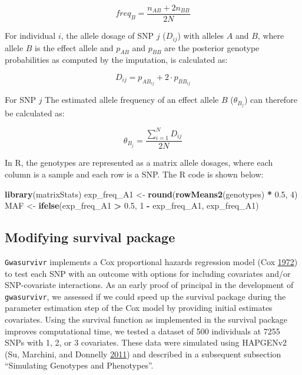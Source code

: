 \documentclass[]{DissertateOSU}
\newenvironment{Shaded}{\begin{snugshade}}{\end{snugshade}}
\newcommand{\KeywordTok}[1]{\textcolor[rgb]{0.13,0.29,0.53}{\textbf{#1}}}
\newcommand{\DecValTok}[1]{\textcolor[rgb]{0.00,0.00,0.81}{#1}}
\newcommand{\FloatTok}[1]{\textcolor[rgb]{0.00,0.00,0.81}{#1}}
\newcommand{\StringTok}[1]{\textcolor[rgb]{0.31,0.60,0.02}{#1}}
\newcommand{\OperatorTok}[1]{\textcolor[rgb]{0.81,0.36,0.00}{\textbf{#1}}}
\newcommand{\NormalTok}[1]{#1}
\begin{document}
\begin{equation} \label{1}
freq_B =  \frac{ n_{AB} + 2n_{BB}}{2N}
\end{equation}

\noindent For individual \(i\), the allele dosage of SNP \(j\)
(\(D_{ij}\)) with alleles \(A\) and \(B\), where allele \(B\) is the
effect allele and \(p_{AB}\) and \(p_{BB}\) are the posterior genotype
probabilities as computed by the imputation, is calculated as:

\begin{equation} \label{2}
D_{ij} = p_{AB_{ij}} + 2 \cdot p_{BB_{ij}}
\end{equation}

\noindent For SNP \(j\) The estimated allele frequency of an effect
allele \(B\) (\(\theta_{B_j}\)) can therefore be calculated as:

\begin{equation} \label{3}
\theta_{B_j} = \frac{\sum_{i=1}^{N} D_{ij} }{2N}
\end{equation}

\noindent In R, the genotypes are represented as a matrix allele
dosages, where each column is a sample and each row is a SNP. The R code
is shown below:

\singlespacing

\begin{Shaded}
\begin{Highlighting}[]
\KeywordTok{library}\NormalTok{(matrixStats)}
\NormalTok{exp_freq_A1 <-}\StringTok{ }\KeywordTok{round}\NormalTok{(}\KeywordTok{rowMeans2}\NormalTok{(genotypes) }\OperatorTok{*}\StringTok{ }\FloatTok{0.5}\NormalTok{, }
    \DecValTok{4}\NormalTok{)}
\NormalTok{MAF <-}\StringTok{ }\KeywordTok{ifelse}\NormalTok{(exp_freq_A1 }\OperatorTok{>}\StringTok{ }\FloatTok{0.5}\NormalTok{, }\DecValTok{1} \OperatorTok{-}\StringTok{ }\NormalTok{exp_freq_A1, }
\NormalTok{    exp_freq_A1)}
\end{Highlighting}
\end{Shaded}

\doublespacing 

\subsection{Modifying survival
package}\label{modifying-survival-package}

\texttt{Gwasurvivr} implements a Cox proportional hazards regression
model (Cox \protect\hyperlink{ref-cox1972}{1972}) to test each SNP with
an outcome with options for including covariates and/or SNP-covariate
interactions. As an early proof of principal in the development of
\texttt{gwasurvivr}, we assessed if we could speed up the survival
package during the parameter estimation step of the Cox model by
providing initial estimates covariates. Using the survival function as
implemented in the survival package improves computational time, we
tested a dataset of 500 individuals at 7255 SNPs with 1, 2, or 3
covariates. These data were simulated using HAPGENv2 (Su, Marchini, and
Donnelly \protect\hyperlink{ref-hapgen2}{2011}) and described in a
subsequent subsection ``Simulating Genotypes and Phenotypes''.
\end{document}
